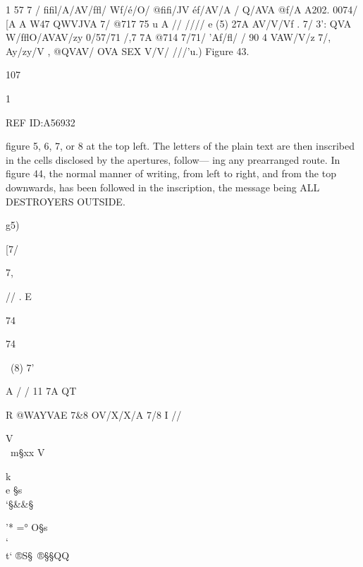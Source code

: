  

 

 

 

1
57 %
7%
/ ﬁﬁl/A/AV/fﬂ/
Wf/é/O/ @ﬁﬁ/JV
éf/AV/A /%
Q/AVA @f/A A202.
0074/ [A A W47
QWVJVA 7/ @717
75%
u A // //// e
(5)
27A AV/V/Vf . 7/ 3':
QVA W/fﬂO/AVAV/zy
0/57/71 /,7 7A
@714 7/71/ ’Af/ﬂ/
/%
90 4%
VAW/V/z 7/, Ay/zy/V
, @QVAV/ OVA
SEX V/V/ ///’u.)
Figure 43.

107

 

1%

REF ID:A56932

ﬁgure 5, 6, 7, or 8 at the top left. The letters of the plain text
are then inscribed in the cells disclosed by the apertures, follow—
ing any prearranged route. In ﬁgure 44, the normal manner of
writing, from left to right, and from the top downwards, has
been followed in the inscription, the message being ALL
DESTROYERS OUTSIDE.

g5)

 

[7/

7,

// .
E

74

74

 

\
(8) 7'

 

A /
/%
11%
7A
QT

R
@WAYVAE
7&8 OV/X/X/A
7/8 I //

 

 

 

V
\\
\ m§xx
V

k\\
e §s\\‘§&&§\\\“

 

 

 

 

'* =° O\x§s\\\lr‘ \\ t‘
®S§\ ®§§QQ\

 

 

 

 

